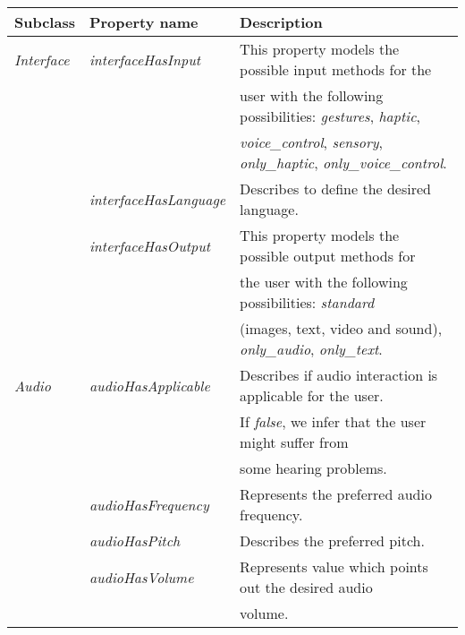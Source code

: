\begin{center}
\footnotesize
\begin{longtable}{l l l}
  
  \label{tbl:user_characteristics_ontology} \\
  \hline 
  \textbf{Subclass} 	& \textbf{Property name} 	& \textbf{Description}							\\
  \hline
  \textit{Interface}	& \textit{interfaceHasInput}	& This property models the possible input methods for the		\\
			& 				& user with the following possibilities: \textit{gestures}, \textit{haptic},\\
			& 				& \textit{voice\_control}, \textit{sensory}, \textit{only\_haptic}, \textit{only\_voice\_control}.\\
			& \textit{interfaceHasLanguage}	& Describes to define the desired language. 				\\
			& \textit{interfaceHasOutput}	& This property models the possible output  methods for 		\\
			& 				& the user with the following possibilities: \textit{standard}  	\\
			& 				& (images, text, video and sound), \textit{only\_audio}, \textit{only\_text}.	\\
  
  \textit{Audio}	& \textit{audioHasApplicable}	& Describes if audio interaction is applicable for the user. 		\\ 
			& 				& If \textit{false}, we infer that the user might suffer from		\\
  			& 				& some hearing problems.						\\
  			& \textit{audioHasFrequency}	& Represents the preferred audio frequency. 				\\
  			& \textit{audioHasPitch}	& Describes the preferred pitch. 					\\
  			& \textit{audioHasVolume}	& Represents value which points out the desired audio 			\\
  			&				& volume.								\\
  			

\end{longtable}
\end{center}
